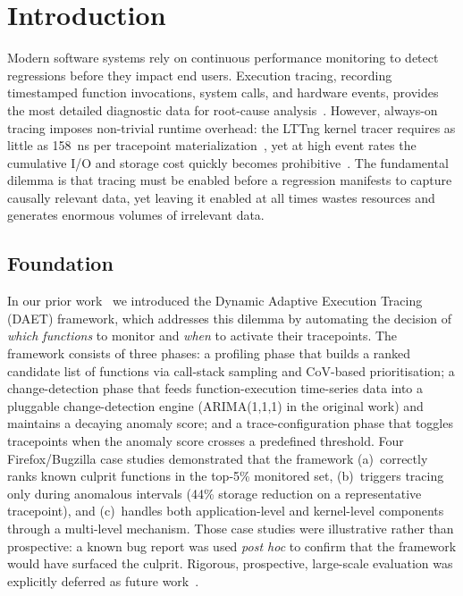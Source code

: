 \documentclass[a4paper,fleqn]{cas-sc}
\theoremstyle{plain}
\begin{document}
\section{Introduction}\label{sec:intro}

Modern software systems rely on continuous performance monitoring to detect
regressions before they impact end users.
Execution tracing, recording timestamped function invocations, system calls,
and hardware events, provides the most detailed diagnostic data for root-cause
analysis~\cite{cantrill2004dynamic,desnoyers2006lttng,rostedt2010ftrace}.
However, always-on tracing imposes non-trivial runtime overhead: the
LTTng kernel tracer requires as little as 158~ns per tracepoint
materialization~\cite{gebai-2018}, yet at high event rates the cumulative
I/O and storage cost quickly becomes prohibitive~\cite{arulraj2013production}.
The fundamental dilemma is that tracing must be enabled before a regression
manifests to capture causally relevant data, yet leaving it enabled at all
times wastes resources and generates enormous volumes of irrelevant data.

\subsection{Foundation}\label{sec:intro:conference}

In our prior work~\cite{10197790} we introduced the Dynamic Adaptive Execution
Tracing (DAET) framework, which addresses this dilemma by automating the
decision of \emph{which functions} to monitor and \emph{when} to activate
their tracepoints.
The framework consists of three phases:
a profiling phase that builds a ranked candidate list of functions via
call-stack sampling and CoV-based prioritisation;
a change-detection phase that feeds function-execution time-series data into
a pluggable change-detection engine (ARIMA(1,1,1) in the original work)
and maintains a decaying anomaly score; and
a trace-configuration phase that toggles tracepoints when the anomaly score
crosses a predefined threshold.
Four Firefox/Bugzilla case studies demonstrated that the framework
(a)~correctly ranks known culprit functions in the top-5\% monitored set,
(b)~triggers tracing only during anomalous intervals (44\% storage reduction
on a representative tracepoint), and (c)~handles both application-level and
kernel-level components through a multi-level mechanism.
Those case studies were illustrative rather than prospective: a known bug
report was used \emph{post hoc} to confirm that the framework would have
surfaced the culprit.
Rigorous, prospective, large-scale evaluation was explicitly deferred as
future work~\cite{10197790}.
\end{document}
